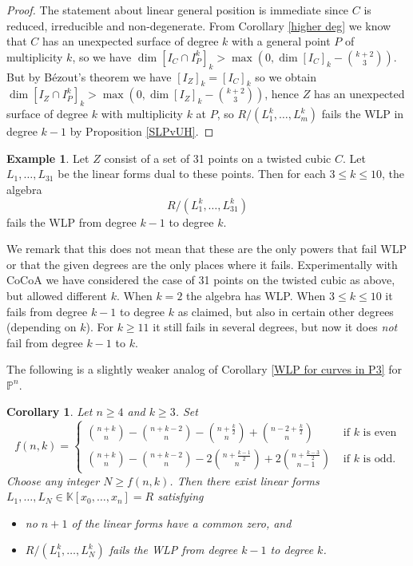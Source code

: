 \documentclass[12pt]{amsart}
\numberwithin{equation}{section}
\newtheorem{corollary}[theorem]{Corollary}
\theoremstyle{definition}
\newtheorem{example}[theorem]{Example}
\newcommand{\PP}{ \ensuremath{\mathbb{P}}}
\newcommand{\KK}{ \ensuremath{\mathbb{K}}}
\begin{document}
\begin{proof}
The statement about linear general position is immediate since $C$ is reduced, irreducible and non-degenerate. 
From Corollary \ref{higher deg} we know that $C$ has an unexpected surface of degree $k$ with a general point $P$ of multiplicity $k$, so 
we have $\dim [I_C \cap I_P^k]_k>\max(0,\dim [I_C]_k - \binom{k+2}{3})$.
But by B\'ezout's theorem we have $[I_Z]_k = [I_C]_k$ so we obtain $\dim [I_Z \cap I_P^k]_k>\max(0,\dim [I_Z]_k - \binom{k+2}{3})$,
hence $Z$ has an unexpected surface of degree $k$ with multiplicity $k$ at $P$, so 
$R/(L_1^k,\dots,L_m^k)$ fails the WLP in degree $k-1$ by Proposition \ref{SLPvUH}.
\end{proof}

\begin{example}
Let $Z$ consist of a set of 31 points on a twisted cubic $C$. Let $L_1,\dots,L_{31}$ be the linear forms dual to these points. Then for each $3 \leq k \leq 10$,  the algebra
\[
R/(L_1^k,\dots,L_{31}^k)
\]
fails the WLP from degree $k-1$ to degree $k$.

We remark that this does not mean that these are the only powers that fail WLP or that the given degrees are the only places where it fails. 
Experimentally  with CoCoA \cite{cocoa} we have considered the case of 31 points on the twisted cubic as above, but allowed different $k$. 
When $k=2$ the algebra has WLP. When $3 \leq k \leq 10$ it fails from degree $k-1$ to degree $k$ as claimed, but also in certain other 
degrees (depending on $k$). For $k \geq 11$ it still fails in several degrees, but now it does {\em not} fail from degree $k-1$ to $k$.

\end{example}

The following is a slightly weaker  analog of Corollary \ref{WLP for curves in P3} for $\PP^n$.



\begin{corollary} \label{WLP Pn cons}
Let $n \geq 4$ and $k \geq 3$. Set 
\[
f(n, k) = \begin{cases}
\binom{n+k}{n} - \binom{n+k-2}{n} - \binom{n + \frac{k}{2}}{n} + \binom{n -2 + \frac{k}{2}}{n} & \text{ if $k$ is even} \\
\binom{n+k}{n} - \binom{n+k-2}{n} - 2 \binom{n + \frac{k-1}{2}}{n} +  2 \binom{n + \frac{k-3}{2}}{n-1} & \text{ if $k$ is odd.}
\end{cases}
\]
Choose any integer $N \geq f(n,k)$. Then there exist linear forms $L_1,\dots,L_N \in \KK[x_0,\dots,x_n] = R$ satisfying

\begin{itemize}

\item no $n+1$ of the linear forms have a common zero, and

\item $R/(L_1^k,\dots,L_N^k)$ fails the WLP from degree $k-1$ to degree $k$.

\end{itemize}
\end{corollary}
\end{document}
